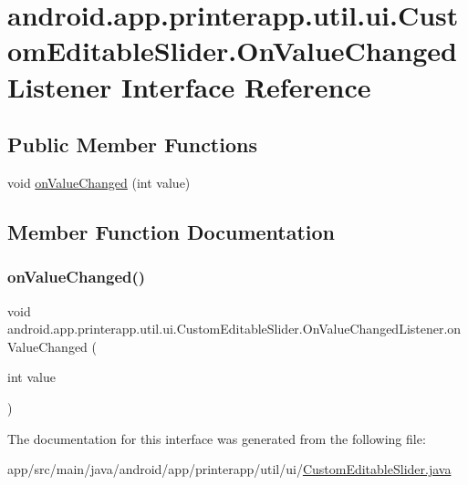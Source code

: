 \hypertarget{interfaceandroid_1_1app_1_1printerapp_1_1util_1_1ui_1_1_custom_editable_slider_1_1_on_value_changed_listener}{}\section{android.\+app.\+printerapp.\+util.\+ui.\+Custom\+Editable\+Slider.\+On\+Value\+Changed\+Listener Interface Reference}
\label{interfaceandroid_1_1app_1_1printerapp_1_1util_1_1ui_1_1_custom_editable_slider_1_1_on_value_changed_listener}
\subsection*{Public Member Functions}
\begin{DoxyCompactItemize}
\item 
void \hyperlink{interfaceandroid_1_1app_1_1printerapp_1_1util_1_1ui_1_1_custom_editable_slider_1_1_on_value_changed_listener_ac6fc7765bd20e7183a3d5e6153f09c59}{on\+Value\+Changed} (int value)
\end{DoxyCompactItemize}


\subsection{Member Function Documentation}
\mbox{\label{interfaceandroid_1_1app_1_1printerapp_1_1util_1_1ui_1_1_custom_editable_slider_1_1_on_value_changed_listener_ac6fc7765bd20e7183a3d5e6153f09c59}} 
\subsubsection{\texorpdfstring{on\+Value\+Changed()}{onValueChanged()}}
{\footnotesize\ttfamily void android.\+app.\+printerapp.\+util.\+ui.\+Custom\+Editable\+Slider.\+On\+Value\+Changed\+Listener.\+on\+Value\+Changed (\begin{DoxyParamCaption}\item[{int}]{value }\end{DoxyParamCaption})}



The documentation for this interface was generated from the following file\+:\begin{DoxyCompactItemize}
\item 
app/src/main/java/android/app/printerapp/util/ui/\hyperlink{_custom_editable_slider_8java}{Custom\+Editable\+Slider.\+java}\end{DoxyCompactItemize}
